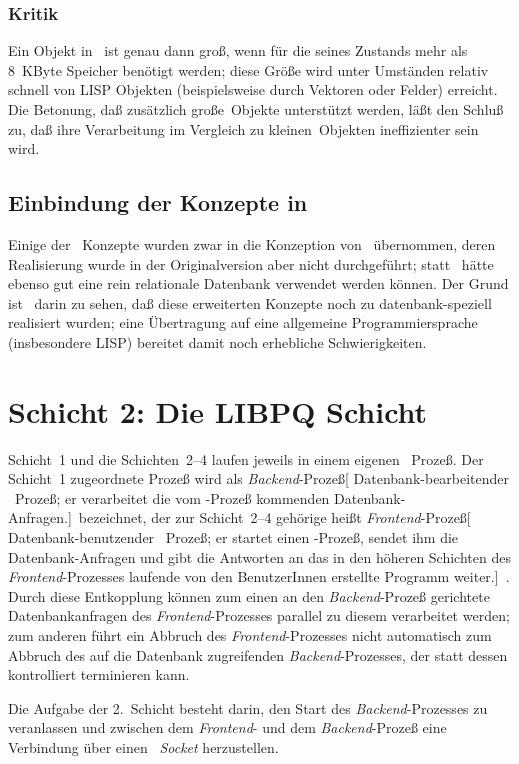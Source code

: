 \subsubsection{Kritik}
%
Ein Objekt in \postgres\ ist genau dann gro\ss{}, wenn f\"{u}r die
\representation{} seines Zustands mehr als 8~KByte Speicher ben\"{o}tigt
werden; diese Gr\"{o}\ss{}e wird unter Umst\"{a}nden relativ schnell von LISP
Objekten (beispielsweise durch Vektoren oder Felder) erreicht. Die
Betonung, da\ss{} zu\-s\"{a}tz\-lich \rglq{}gro\ss{}e\rgrq\ Objekte unterst\"{u}tzt
werden, l\"{a}\ss{}t den Schlu\ss{} zu, da\ss{} ihre Verarbeitung im Vergleich zu
\rglq{}kleinen\rgrq\ Objekten ineffizienter sein wird.
%
\subsection{Einbindung der Konzepte in \protect\soh}
%
Einige der \og\ Konzepte wurden zwar in die Konzeption von
\soh\ \"{u}bernommen, deren Realisierung wurde in der Originalversion aber
nicht durchgef\"{u}hrt; statt \postgres\ h\"{a}tte ebenso gut eine rein
relationale Datenbank verwendet werden k\"{o}nnen. Der Grund ist
\ua\ darin zu sehen, da\ss{} diese erweiterten Konzepte noch zu
datenbank-speziell realisiert wurden; eine \"{U}bertragung auf eine
allgemeine Programmiersprache (insbesondere LISP) bereitet damit noch
erhebliche Schwierigkeiten.
%
\section{Schicht 2: Die LIBPQ Schicht}
%
Schicht~1 und die Schichten~2--4 laufen jeweils in einem eigenen
\unix\ Proze\ss{}. Der Schicht~1 zugeordnete Proze\ss{} wird als {\em
Backend\/}-Proze\ss{}[{%
Datenbank-bearbeitender \protect\unix\ Proze\ss{}; er verarbeitet die
vom {\protect{}}-Pro\-ze\ss{} kommenden
Datenbank-Anfragen.}]\ bezeichnet, der zur Schicht~2--4 geh\"{o}rige
hei\ss{}t {\em Frontend\/}-Proze\ss{}[{%
Datenbank-benutzender \protect\unix\ Proze\ss{}; er startet einen
{\protect{}}-Pro\-ze\ss{}, sendet ihm die
Datenbank-Anfragen und gibt die Antworten an das in den h\"{o}heren
Schichten des {\protect\em Frontend\/}-Prozesses laufende
von den BenutzerInnen erstellte Programm
weiter.}]\ \cite[]{bib:we93}. Durch diese Entkopplung
k\"{o}nnen zum einen an den {\em Backend\/}-Proze\ss{} gerichtete
Datenbankanfragen des {\em Frontend\/}-Prozesses parallel zu diesem
verarbeitet werden; zum anderen f\"{u}hrt ein Abbruch des
{\em Frontend\/}-Prozesses nicht automatisch zum Abbruch des auf die
Datenbank zugreifenden {\em Backend\/}-Prozesses, der statt dessen
kontrolliert terminieren kann.
%
\par{}Die Aufgabe der 2.~Schicht besteht darin, den Start des {\em
Backend\/}-Prozesses zu veranlassen und zwischen dem {\em
Frontend\/}- und dem {\em Backend\/}-Proze\ss{} eine Verbindung \"{u}ber
einen \unix\ {\em Socket\/} \cite{bib:socket} herzustellen.
%
